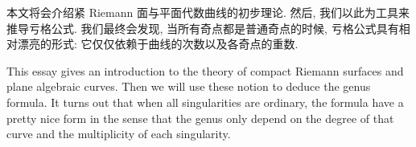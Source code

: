 \begin{cabstract}
    \songti
本文将会介绍紧 Riemann 面与平面代数曲线的初步理论.
然后, 我们以此为工具来推导亏格公式.
我们最终会发现, 当所有奇点都是普通奇点的时候,
亏格公式具有相对漂亮的形式: 它仅仅依赖于曲线的次数以及各奇点的重数.
\end{cabstract}

\begin{eabstract}
This essay gives an introduction to the theory of compact Riemann surfaces
and plane algebraic curves. Then we will use these notion to deduce
the genus formula.
It turns out that when all singularities are ordinary,
the formula have a pretty nice form in the sense that
the genus only depend on the degree of that curve and the multiplicity
of each singularity.
\end{eabstract}

